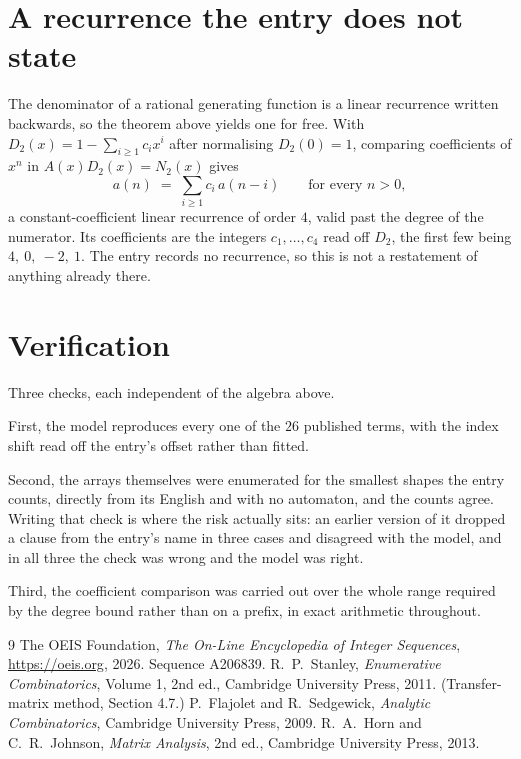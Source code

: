 \documentclass[11pt,a4paper]{article}
\theoremstyle{plain}
\theoremstyle{definition}
\begin{document}
\section{A recurrence the entry does not state}

The denominator of a rational generating function is a linear recurrence written backwards, so
the theorem above yields one for free. With $D_2(x)=1-\sum_{i\ge1}c_ix^i$ after normalising
$D_2(0)=1$, comparing coefficients of $x^n$ in $A(x)D_2(x)=N_2(x)$ gives
\[
a(n)\;=\;\sum_{i\ge1}c_i\,a(n-i)\qquad\text{for every }n>0,
\]
a constant-coefficient linear recurrence of order $4$, valid past the degree of the
numerator. Its coefficients are the integers $c_1,\dots,c_{4}$ read off $D_2$, the first few being $4,\ 0,\ -2,\ 1$. The entry records no recurrence, so this is not a restatement of anything
already there.

\section{Verification}

Three checks, each independent of the algebra above.

First, the model reproduces every one of the $26$ published terms, with the index shift
read off the entry's offset rather than fitted.

Second, the arrays themselves were enumerated for the smallest shapes the entry counts,
directly from its English and with no automaton, and the counts agree. Writing that check is
where the risk actually sits: an earlier version of it dropped a clause from the entry's name
in three cases and disagreed with the model, and in all three the check was wrong and the model
was right.

Third, the coefficient comparison was carried out over the whole range required by the degree
bound rather than on a prefix, in exact arithmetic throughout.

\begin{thebibliography}{9}
 The OEIS Foundation, \emph{The On-Line Encyclopedia of Integer
Sequences}, \url{https://oeis.org}, 2026. Sequence A206839.
 R.~P.~Stanley, \emph{Enumerative Combinatorics}, Volume 1, 2nd ed.,
Cambridge University Press, 2011. (Transfer-matrix method, Section 4.7.)
 P.~Flajolet and R.~Sedgewick, \emph{Analytic Combinatorics}, Cambridge
University Press, 2009.
 R.~A.~Horn and C.~R.~Johnson, \emph{Matrix Analysis}, 2nd ed., Cambridge
University Press, 2013.
\end{thebibliography}
\end{document}
